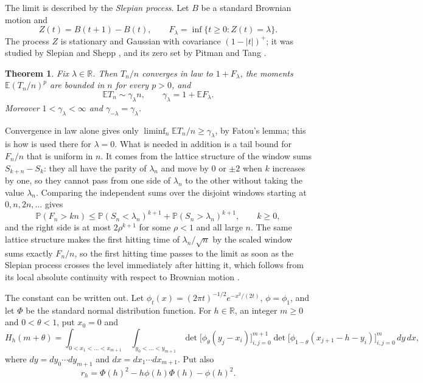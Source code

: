 \documentclass[11pt]{amsart}
\newtheorem{theorem}{Theorem}[section]
\theoremstyle{remark}
\numberwithin{equation}{section}
\newcommand{\PP}{\mathbb{P}}
\newcommand{\EE}{\mathbb{E}}
\newcommand{\R}{\mathbb{R}}
\begin{document}
The limit is described by the \emph{Slepian process}. Let $B$ be a standard Brownian motion and
\[
Z(t)=B(t+1)-B(t),\qquad F_\lambda=\inf\{t\ge0:Z(t)=\lambda\}.
\]
The process $Z$ is stationary and Gaussian with covariance $(1-|t|)^+$; it was studied by Slepian \cite{Slepian} and Shepp \cite{Shepp}, and its zero set by Pitman and Tang \cite{PTS}.

\begin{theorem}\label{thm:main}
Fix $\lambda\in\R$. Then $T_n/n$ converges in law to $1+F_\lambda$, the moments $\EE(T_n/n)^p$ are bounded in $n$ for every $p>0$, and
\begin{equation}\label{eq:main}
\EE T_n\sim\gamma_\lambda n,\qquad \gamma_\lambda=1+\EE F_\lambda.
\end{equation}
Moreover $1<\gamma_\lambda<\infty$ and $\gamma_{-\lambda}=\gamma_\lambda$.
\end{theorem}

Convergence in law alone gives only $\liminf_n\EE T_n/n\ge\gamma_\lambda$, by Fatou's lemma; this is how \cite[Proposition~2.4]{PT} is used there for $\lambda=0$. What is needed in addition is a tail bound for $F_n/n$ that is uniform in $n$. It comes from the lattice structure of the window sums $S_{k+n}-S_k$: they all have the parity of $\lambda_n$ and move by $0$ or $\pm2$ when $k$ increases by one, so they cannot pass from one side of $\lambda_n$ to the other without taking the value $\lambda_n$. Comparing the independent sums over the disjoint windows starting at $0,n,2n,\dots$ gives
\begin{equation}\label{eq:tail-intro}
\PP(F_n>kn)\le\PP(S_n<\lambda_n)^{k+1}+\PP(S_n>\lambda_n)^{k+1},\qquad k\ge0,
\end{equation}
and the right side is at most $2\rho^{k+1}$ for some $\rho<1$ and all large $n$. The same lattice structure makes the first hitting time of $\lambda_n/\sqrt n$ by the scaled window sums exactly $F_n/n$, so the first hitting time passes to the limit as soon as the Slepian process crosses the level immediately after hitting it, which follows from its local absolute continuity with respect to Brownian motion \cite[Lemma~4.3]{PTS}.

The constant can be written out. Let $\phi_t(x)=(2\pi t)^{-1/2}e^{-x^2/(2t)}$, $\phi=\phi_1$, and let $\Phi$ be the standard normal distribution function. For $h\in\R$, an integer $m\ge0$ and $0<\theta<1$, put $x_0=0$ and
\begin{equation}\label{eq:H}
H_h(m+\theta)=\int_{0<x_1<\dots<x_{m+1}}\ \int_{y_0<\dots<y_{m+1}}\det\bigl[\phi_\theta(y_j-x_i)\bigr]_{i,j=0}^{m+1}\det\bigl[\phi_{1-\theta}(x_{j+1}-h-y_i)\bigr]_{i,j=0}^{m}\,dy\,dx,
\end{equation}
where $dy=dy_0\cdots dy_{m+1}$ and $dx=dx_1\cdots dx_{m+1}$. Put also
\begin{equation}\label{eq:rh}
r_h=\Phi(h)^2-h\phi(h)\Phi(h)-\phi(h)^2.
\end{equation}
\end{document}
